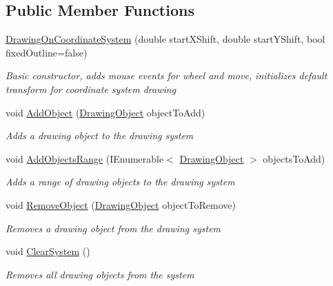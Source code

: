 \subsection*{Public Member Functions}
\begin{DoxyCompactItemize}
\item 
\hyperlink{class_w_p_f_visualization_base_1_1_drawing_on_coordinate_system_a938714212beab4d547f733b475c9c28f}{Drawing\+On\+Coordinate\+System} (double start\+X\+Shift, double start\+Y\+Shift, bool fixed\+Outline=false)
\begin{DoxyCompactList}\small\item\em Basic constructor, adds mouse events for wheel and move, initializes default transform for coordinate system drawing \end{DoxyCompactList}\item 
void \hyperlink{class_w_p_f_visualization_base_1_1_drawing_on_coordinate_system_a7e0f1af7a307546a48bc6e948dd60cea}{Add\+Object} (\hyperlink{class_w_p_f_visualization_base_1_1_drawing_object}{Drawing\+Object} object\+To\+Add)
\begin{DoxyCompactList}\small\item\em Adds a drawing object to the drawing system \end{DoxyCompactList}\item 
void \hyperlink{class_w_p_f_visualization_base_1_1_drawing_on_coordinate_system_acb1821eda18eb95b83dacc1a9f797025}{Add\+Objects\+Range} (I\+Enumerable$<$ \hyperlink{class_w_p_f_visualization_base_1_1_drawing_object}{Drawing\+Object} $>$ objects\+To\+Add)
\begin{DoxyCompactList}\small\item\em Adds a range of drawing objects to the drawing system \end{DoxyCompactList}\item 
void \hyperlink{class_w_p_f_visualization_base_1_1_drawing_on_coordinate_system_a6f6d660aef18c2865852987a9a9f4ed2}{Remove\+Object} (\hyperlink{class_w_p_f_visualization_base_1_1_drawing_object}{Drawing\+Object} object\+To\+Remove)
\begin{DoxyCompactList}\small\item\em Removes a drawing object from the drawing system \end{DoxyCompactList}\item 
void \hyperlink{class_w_p_f_visualization_base_1_1_drawing_on_coordinate_system_add9ba60f6e266e773a36c105be8abc64}{Clear\+System} ()
\begin{DoxyCompactList}\small\item\em Removes all drawing objects from the system \end{DoxyCompactList}\item 

\end{DoxyCompactItemize}

